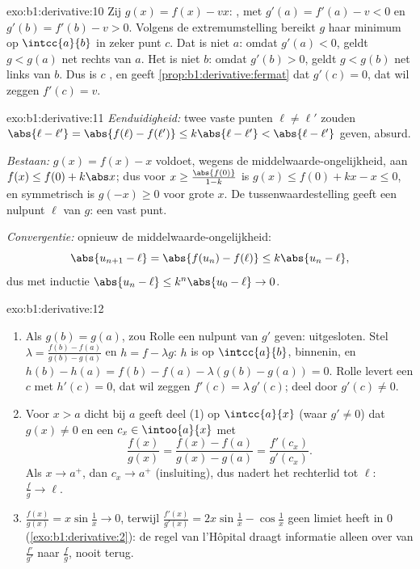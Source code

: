 \begin{solution}{exo:b1:derivative:10}
Zij $g(x) = f(x) - vx$: , met $g'(a) = f'(a) - v < 0$ en
$g'(b) = f'(b) - v > 0$. Volgens de extremumstelling bereikt $g$ haar
minimum op $\intcc{a}{b}$ in zeker punt $c$. Dat is niet $a$: omdat
$g'(a) < 0$, geldt $g < g(a)$ net rechts van $a$. Het is niet $b$:
omdat $g'(b) > 0$, geldt $g < g(b)$ net links van $b$. Dus is $c$
, en geeft \cref{prop:b1:derivative:fermat} dat $g'(c) = 0$,
dat wil zeggen $f'(c) = v$.
\end{solution}

\begin{solution}{exo:b1:derivative:11}
\emph{Eenduidigheid:} twee vaste punten $\ell \neq \ell'$ zouden
$\abs{\ell - \ell'} = \abs{f(\ell) - f(\ell')} \leq k\abs{\ell -
\ell'} < \abs{\ell - \ell'}$ geven, absurd.

\emph{Bestaan:} $g(x) = f(x) - x$ voldoet, wegens de
middelwaarde-ongelijkheid, aan $f(x) \leq f(0) + k\abs x$; dus voor
$x \geq \frac{\abs{f(0)}}{1 - k}$ is $g(x) \leq f(0) + kx - x \leq
0$, en symmetrisch is $g(-x) \geq 0$ voor grote $x$. De
tussenwaardestelling geeft een nulpunt $\ell$ van $g$: een vast punt.

\emph{Convergentie:} opnieuw de middelwaarde-ongelijkheid:
\[
\abs{u_{n+1} - \ell} = \abs{f(u_n) - f(\ell)} \leq k\abs{u_n - \ell},
\]
dus met inductie $\abs{u_n - \ell} \leq k^n \abs{u_0 - \ell} \to 0$.
\end{solution}

\begin{solution}{exo:b1:derivative:12}
\begin{enumerate}
  \item Als $g(b) = g(a)$, zou Rolle een  nulpunt van
        $g'$ geven: uitgesloten. Stel $\lambda = \frac{f(b) -
        f(a)}{g(b) - g(a)}$ en $h = f - \lambda g$: $h$ is 
        op $\intcc{a}{b}$,  binnenin, en $h(b) - h(a) =
        f(b) - f(a) - \lambda(g(b) - g(a)) = 0$. Rolle levert een
        $c$ met $h'(c) = 0$, dat wil zeggen $f'(c) =
        \lambda\,g'(c)$; deel door $g'(c) \neq 0$.
  \item Voor $x > a$ dicht bij $a$ geeft deel (1) op
        $\intcc{a}{x}$ (waar $g' \neq 0$) dat $g(x) \neq 0$ en een
        $c_x \in \intoo{a}{x}$ met
        \[
        \frac{f(x)}{g(x)} = \frac{f(x) - f(a)}{g(x) - g(a)}
        = \frac{f'(c_x)}{g'(c_x)} .
        \]
        Als $x \to a^+$, dan $c_x \to a^+$ (insluiting), dus
        nadert het rechterlid tot $\ell$: $\frac{f}{g} \to \ell$.
  \item $\frac{f(x)}{g(x)} = x\sin\frac1x \to 0$, terwijl
        $\frac{f'(x)}{g'(x)} = 2x\sin\frac1x - \cos\frac1x$ geen
        limiet heeft in $0$ (\cref{exo:b1:derivative:2}): de regel
        van l'Hôpital draagt informatie alleen over van
        $\frac{f'}{g'}$ naar $\frac fg$, nooit terug.
\end{enumerate}
\end{solution}

